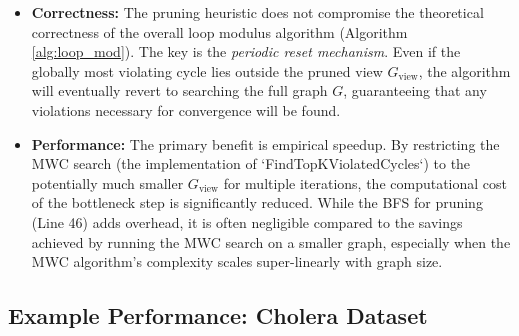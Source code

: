 \documentclass{article}
\begin{document}
\begin{itemize}
    \item \textbf{Correctness:} The pruning heuristic does not compromise the theoretical correctness of the overall loop modulus algorithm (Algorithm \ref{alg:loop_mod}). The key is the \textit{periodic reset mechanism}. Even if the globally most violating cycle lies outside the pruned view $G_{\text{view}}$, the algorithm will eventually revert to searching the full graph $G$, guaranteeing that any violations necessary for convergence will be found.
    \item \textbf{Performance:} The primary benefit is empirical speedup. By restricting the MWC search (the implementation of `FindTopKViolatedCycles`) to the potentially much smaller $G_{\text{view}}$ for multiple iterations, the computational cost of the bottleneck step is significantly reduced. While the BFS for pruning (Line 46) adds overhead, it is often negligible compared to the savings achieved by running the MWC search on a smaller graph, especially when the MWC algorithm's complexity scales super-linearly with graph size.
\end{itemize}



\subsection{Example Performance: Cholera Dataset}
\label{subsec:cholera_example}
\end{document}
